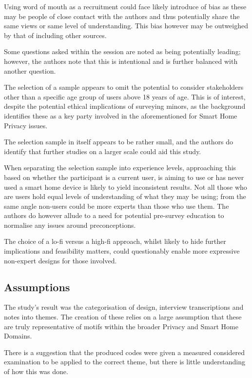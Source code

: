Using word of mouth as a recruitment could face likely introduce of bias as these may be people of close contact with the authors and thus potentially share the same views or same level of understanding. This bias however may be outweighed by that of including other sources.

Some questions asked within the session are noted as being potentially leading; however, the authors note that this is intentional and is further balanced with another question.

The selection of a sample appears to omit the potential to consider stakeholders other than a specific age group of users above 18 years of age. This is of interest, despite the potential ethical implications of surveying minors, as the background identifies these as a key party involved in the aforementioned for Smart Home Privacy issues.

The selection sample in itself appears to be rather small, and the authors do identify that further studies on a larger scale could aid this study.

When separating the selection sample into experience levels, approaching this based on whether the participant is a current user, is aiming to use or has never used a smart home device is likely to yield inconsistent results. Not all those who are users hold equal levels of understanding of what they may be using; from the same angle non-users could be more experts than those who use them. The authors do however allude to a need for potential pre-survey education to normalise any issues around preconceptions.

The choice of a lo-fi versus a high-fi approach, whilst likely to hide further implications and feasibility matters, could questionably enable more expressive non-expert designs for those involved.

\subsection{Assumptions}

The study's result was the categorisation of design, interview transcriptions and notes into themes. The creation of these relies on a large assumption that these are truly representative of motifs within the broader Privacy and Smart Home Domains. 

There is a suggestion that the produced codes were given a measured considered examination to be applied to the correct theme, but there is little understanding of how this was done.

